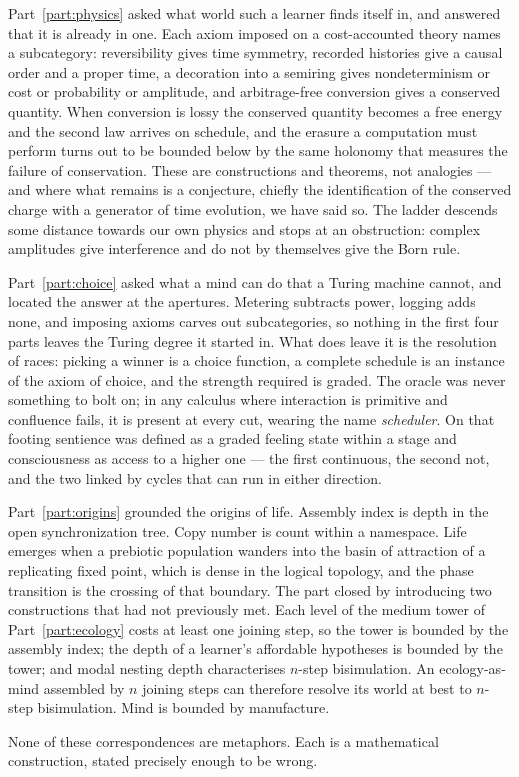 Part~\ref{part:physics} asked what world such a learner finds itself in,
and answered that it is already in one.
Each axiom imposed on a cost-accounted theory names a subcategory:
reversibility gives time symmetry, recorded histories give a causal order
and a proper time, a decoration into a semiring gives nondeterminism or
cost or probability or amplitude, and arbitrage-free conversion gives a
conserved quantity.
When conversion is lossy the conserved quantity becomes a free energy and
the second law arrives on schedule, and the erasure a computation must
perform turns out to be bounded below by the same holonomy that measures
the failure of conservation.
These are constructions and theorems, not analogies --- and where what
remains is a conjecture, chiefly the identification of the conserved
charge with a generator of time evolution, we have said so.
The ladder descends some distance towards our own physics and stops at an
obstruction: complex amplitudes give interference and do not by
themselves give the Born rule.

Part~\ref{part:choice} asked what a mind can do that a Turing machine
cannot, and located the answer at the apertures.
Metering subtracts power, logging adds none, and imposing axioms carves
out subcategories, so nothing in the first four parts leaves the Turing
degree it started in.
What does leave it is the resolution of races: picking a winner is a
choice function, a complete schedule is an instance of the axiom of
choice, and the strength required is graded.
The oracle was never something to bolt on; in any calculus where
interaction is primitive and confluence fails, it is present at every
cut, wearing the name \emph{scheduler}.
On that footing sentience was defined as a graded feeling state within a
stage and consciousness as access to a higher one --- the first
continuous, the second not, and the two linked by cycles that can run in
either direction.

Part~\ref{part:origins} grounded the origins of life.
Assembly index is depth in the open synchronization tree.
Copy number is count within a namespace.
Life emerges when a prebiotic population wanders into the basin of
attraction of a replicating fixed point, which is dense in the logical
topology, and the phase transition is the crossing of that boundary.
The part closed by introducing two constructions that had not previously
met.
Each level of the medium tower of Part~\ref{part:ecology} costs at least
one joining step, so the tower is bounded by the assembly index; the
depth of a learner's affordable hypotheses is bounded by the tower; and
modal nesting depth characterises $n$-step bisimulation.
An ecology-as-mind assembled by $n$ joining steps can therefore resolve
its world at best to $n$-step bisimulation.
Mind is bounded by manufacture.

None of these correspondences are metaphors.
Each is a mathematical construction, stated precisely enough to be wrong.
